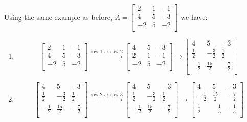 \documentclass[../main/main.tex]{subfiles}
\begin{document}
  \begin{example}
    Using the same example as before, $A =
    \begin{bmatrix}
      2&1&-1 \\
      4&5&-3\\
      -2&5&-2\\
    \end{bmatrix}
    $ we have:
    \begin{enumerate}
      \item \[
    \begin{bmatrix}
      2&1&-1 \\
      4&5&-3\\
      -2&5&-2\\
    \end{bmatrix}
            \xrightarrow{\text{row }1 \leftrightarrow \text{row }2}
    \begin{bmatrix}
      4&5&-3\\
      2&1&-1 \\
      -2&5&-2\\
    \end{bmatrix}
            \to
    \begin{bmatrix}
      4&5&-3\\
      \frac{1}{2}&-\frac{3}{2}&\frac{1}{2} \\
      -\frac{1}{2}&\frac{15}{2}&-\frac{7}{2}\\
    \end{bmatrix}
            \]
      \item \[
    \begin{bmatrix}
      4&5&-3\\
      \frac{1}{2}&-\frac{3}{2}&\frac{1}{2} \\
      -\frac{1}{2}&\frac{15}{2}&-\frac{7}{2}\\
    \end{bmatrix}
            \xrightarrow{\text{row }2 \leftrightarrow \text{row }3}
    \begin{bmatrix}
      4&5&-3\\
      \frac{1}{2}&-\frac{3}{2}&\frac{1}{2} \\
      -\frac{1}{2}&\frac{15}{2}&-\frac{7}{2}\\
    \end{bmatrix}
      \to
    \begin{bmatrix}
      4&5&-3\\
      -\frac{1}{2}&\frac{15}{2}&-\frac{7}{2}\\
      \frac{1}{2}&-\frac{1}{5}&-\frac{1}{5} \\

\end{bmatrix}\]
\end{enumerate}
\end{example}
\end{document}
